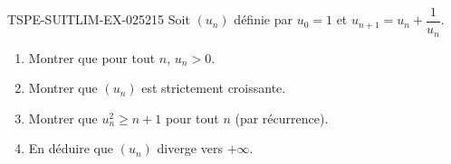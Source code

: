 \begin{exercice}{TSPE-SUITLIM-EX-025}{2}{15}
Soit $(u_n)$ définie par $u_0 = 1$ et $u_{n+1} = u_n + \dfrac{1}{u_n}$.
\begin{enumerate}
  \item Montrer que pour tout $n$, $u_n > 0$.
  \item Montrer que $(u_n)$ est strictement croissante.
  \item Montrer que $u_n^2 \geq n + 1$ pour tout $n$ (par récurrence).
  \item En déduire que $(u_n)$ diverge vers $+\infty$.
\end{enumerate}
\end{exercice}
